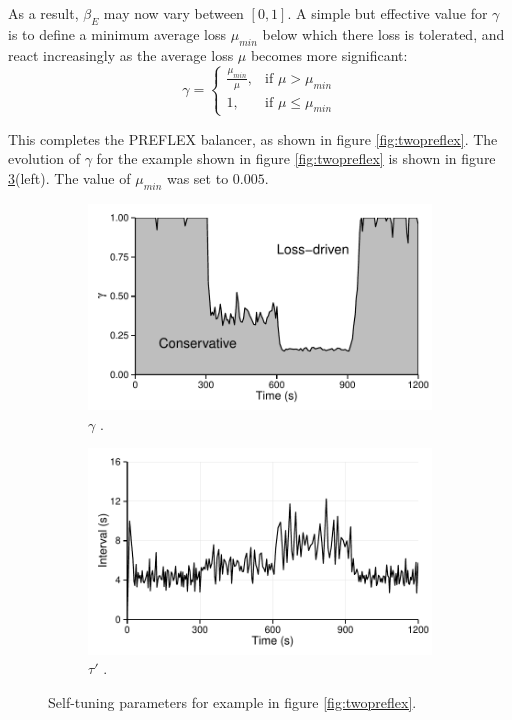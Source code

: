 As a result, $\beta_E$ may now vary between $[0,1]$. 
A simple but effective value for $\gamma$ is to define a minimum average loss $\mu_{min}$ below which there loss is tolerated, and react increasingly as the average loss $\mu$ becomes more significant:
\begin{equation}
\gamma = 
\begin{cases} 
\frac{\mu_{min}}{\mu}, & \mbox{if }\mu > \mu_{min}\\
1, & \mbox{if }\mu \leq \mu_{min}
\end{cases}
\end{equation}

This completes the \ac{PREFLEX} balancer, as shown in figure \ref{fig:twopreflex}. 
The evolution of $\gamma$ for the example shown in figure \ref{fig:twopreflex} is shown in figure \ref{fig:tune}(left). 
The value of $\mu_{min}$ was set to $0.005$.

\begin{figure}
    \centering
    \begin{subfigure}[b]{.5\linewidth}
        \centering
        \includegraphics[width=0.9\linewidth]{figures/cate/gamma}
        \caption{$\gamma$ \label{fig:gamma}.}
    \end{subfigure}%
    \begin{subfigure}[b]{.5\linewidth}
        \centering
        \includegraphics[width=0.9\linewidth]{figures/cate/tau}
        \caption{$\tau'$ \label{fig:tau}.}
    \end{subfigure}
    \caption[Parameters $\gamma$ and $\tau'$]{Self-tuning parameters for example in figure \ref{fig:twopreflex}.}
    \label{fig:tune}
\end{figure}

